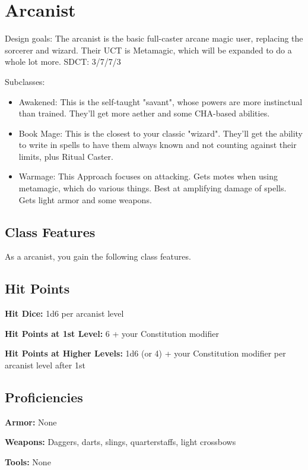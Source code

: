 \section{Arcanist\label{class:arcanist}}

Design goals: The arcanist is the basic full-caster arcane magic user, replacing the sorcerer and wizard. Their UCT is Metamagic, which will be expanded to do a whole lot more. SDCT: 3/7/7/3

Subclasses:
\begin{itemize}
	\item Awakened: This is the self-taught "savant", whose powers are more instinctual than trained. They'll get more aether and some CHA-based abilities.
	\item Book Mage: This is the closest to your classic "wizard". They'll get the ability to write in spells to have them always known and not counting against their limits, plus Ritual Caster.
	\item Warmage: This Approach focuses on attacking. Gets motes when using metamagic, which do various things. Best at amplifying damage of spells. Gets light armor and some weapons.
\end{itemize}

\subsection{Class Features}

As a arcanist, you gain the following class features.

\subsection{Hit Points}

\textbf{Hit Dice:} 1d6 per arcanist level

\textbf{Hit Points at 1st Level:} 6 + your Constitution modifier

\textbf{Hit Points at Higher Levels:} 1d6 (or 4) + your Constitution modifier per arcanist level after 1st

\subsection{Proficiencies}

\textbf{Armor:} None

\textbf{Weapons:} Daggers, darts, slings, quarterstaffs, light crossbows

\textbf{Tools:} None

